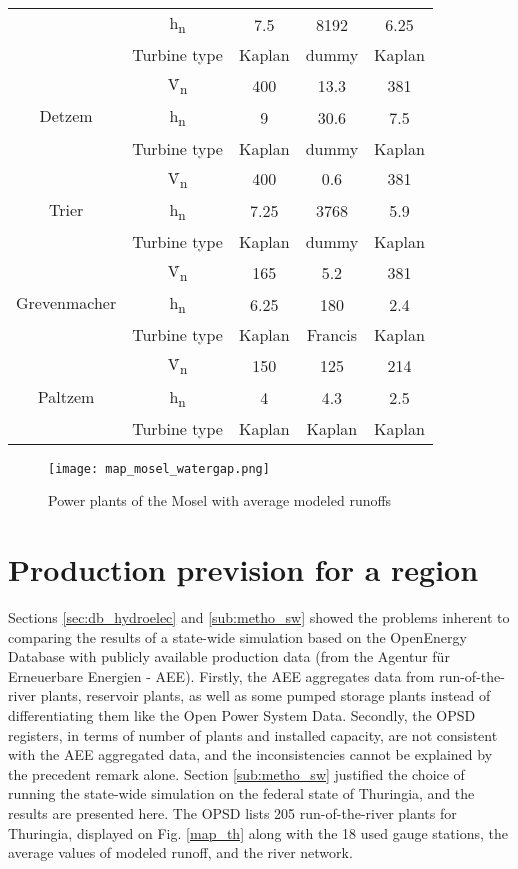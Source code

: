 \begin{longtable}{|c|c|c|c|c|}
  &h\textsubscript{n}&7.5&8192&6.25\\
  &Turbine type&Kaplan&dummy&Kaplan\\
  \hline
  \multirow{3}{*}{Detzem}&\.V\textsubscript{n}&400&13.3&381\\
  &h\textsubscript{n}&9&30.6&7.5\\
  &Turbine type&Kaplan&dummy&Kaplan\\
  \hline
  \multirow{3}{*}{Trier}&\.V\textsubscript{n}&400&0.6&381\\
  &h\textsubscript{n}&7.25&3768&5.9\\
  &Turbine type&Kaplan&dummy&Kaplan\\
  \hline
  \multirow{3}{*}{Grevenmacher}&\.V\textsubscript{n}&165&5.2&381\\
  &h\textsubscript{n}&6.25&180&2.4\\
  &Turbine type&Kaplan&Francis&Kaplan\\
  \hline
  \multirow{3}{*}{Paltzem}&\.V\textsubscript{n}&150&125&214\\
  &h\textsubscript{n}&4&4.3&2.5\\
  &Turbine type&Kaplan&Kaplan&Kaplan\\
\end{longtable}
\endgroup

\begin{figure}[H]
\centering
\texttt{[image: map\_mosel\_watergap.png]}
\caption{Power plants of the Mosel with average modeled runoffs}
\label{map_mosel_watergap}
\end{figure}

\section{Production prevision for a region}
\label{sec:res_th}

Sections \ref{sec:db_hydroelec} and \ref{sub:metho_sw} showed the problems inherent to comparing the results of a state-wide simulation based on the OpenEnergy Database with publicly available production data (from the Agentur für Erneuerbare Energien - AEE). Firstly, the AEE aggregates data from run-of-the-river plants, reservoir plants, as well as some pumped storage plants instead of differentiating them like the Open Power System Data. Secondly, the OPSD registers, in terms of number of plants and installed capacity, are not consistent with the AEE aggregated data, and the inconsistencies cannot be explained by the precedent remark alone. \newline
Section \ref{sub:metho_sw} justified the choice of running the state-wide simulation on the federal state of Thuringia, and the results are presented here. \newline
The OPSD lists 205 run-of-the-river plants for Thuringia, displayed on Fig. \ref{map_th} along with the 18 used gauge stations, the average values of modeled runoff, and the river network.

